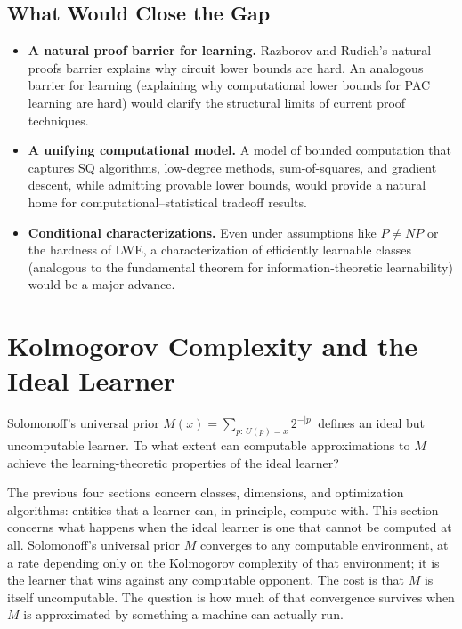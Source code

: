 \subsection{What Would Close the Gap}

\begin{itemize}[leftmargin=*]
\item \textbf{A natural proof barrier for learning.}  Razborov and
  Rudich's natural proofs barrier explains why circuit lower bounds are hard.
  An analogous barrier for learning (explaining why computational lower
  bounds for PAC learning are hard) would clarify the structural limits of
  current proof techniques.
\item \textbf{A unifying computational model.}  A model of bounded
  computation that captures SQ algorithms, low-degree methods,
  sum-of-squares, and gradient descent, while admitting provable lower
  bounds, would provide a natural home for computational--statistical
  tradeoff results.
\item \textbf{Conditional characterizations.}  Even under assumptions
  like $P \neq NP$ or the hardness of LWE, a characterization of
  efficiently learnable classes (analogous to the fundamental theorem for
  information-theoretic learnability) would be a major advance.
\end{itemize}



\section{Kolmogorov Complexity and the Ideal Learner}
\label{sec:kolmogorov-learning}

\begin{openprob}
\label{op:solomonoff-approx}
Solomonoff's universal prior $M(x) = \sum_{p:\, U(p)=x} 2^{-|p|}$ defines
an ideal but uncomputable learner.  To what extent can computable
approximations to $M$ achieve the learning-theoretic properties of the ideal
learner?
\end{openprob}

The previous four sections concern classes, dimensions, and optimization algorithms: entities that a learner can, in principle, compute with.  This section concerns what happens when the ideal learner is one that cannot be computed at all.  Solomonoff's universal prior $M$ converges to any computable environment, at a rate depending only on the Kolmogorov complexity of that environment; it is the learner that wins against any computable opponent.  The cost is that $M$ is itself uncomputable.  The question is how much of that convergence survives when $M$ is approximated by something a machine can actually run.

